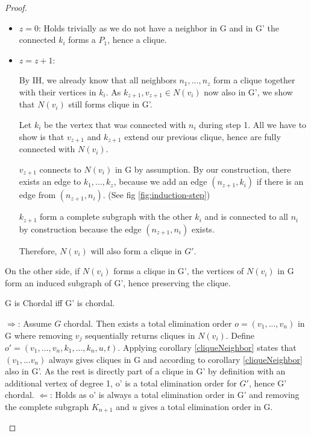 \begin{proof}
\begin{subproof}
        \begin{itemize}
            \item $z = 0$: Holds trivially as we do not have a neighbor in G and in G' the connected $k_i$ forms a $P_1$, hence a clique.
            \item $z = z + 1$: 

            By IH, we already know that all neighbors $n_1,...,n_z$ form a clique together with their vertices in $k_{i}$. As $k_{z+1}, v_{z+1} \in N(v_i)$ now also in G', we show that $N(v_i)$ still forms clique in G'.

            Let $k_i$ be the vertex that was connected with $n_i$ during step 1. All we have to show is that $v_{z+1}$ and $k_{z+1}$ extend our previous clique, hence are fully connected with $N(v_i)$.
            
            $v_{z+1}$ connects to $N(v_i)$ in G by assumption. By our construction, there exists an edge to $k_1,...,k_z$, because we add an edge $(n_{z+1}, k_i)$ if there is an edge from $(n_{z+1}, n_i)$. (See fig \ref{fig:induction-step})

            $k_{z+1}$ form a complete subgraph with the other $k_i$ and is connected to all $n_i$ by construction because the edge $(n_{z+1},n_i)$ exists.  


            Therefore, $N(v_i)$ will also form a clique in $G'$.
        \end{itemize}

        On the other side, if $N(v_i)$ forms a clique in G', the vertices of $N(v_i)$ in G form an induced subgraph of G', hence preserving the clique.
        
    \end{subproof}
   
    \begin{corollary}
    G is Chordal iff G' is chordal.    
    \end{corollary}
    \begin{subproof}
    $\Rightarrow$: Assume $G$ chordal. Then exists a total elimination order $o = (v_1, ..., v_n)$ in G where removing $v_j$ sequentially returns cliques in $N(v_i)$.
    Define $o' = (v_1, ..., v_n, k_1, ..., k_n, u, t)$. Applying corollary \ref*{cliqueNeighbor} states that $(v_1, ... v_n)$ always gives cliques in G and according to corollary \ref*{cliqueNeighbor} also in G'. As the rest is directly part of a clique in G' by definition with an additional vertex of degree 1, o' is a total elimination order for $G'$, hence G' chordal.
    $\Leftarrow$: Holds as o' is always a total elimination order in G' and removing the complete subgraph $K_{n+1}$ and $u$ gives a total elimination order in G.
    \end{subproof}



\end{proof}

